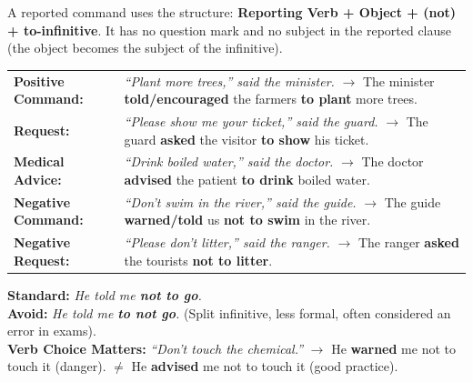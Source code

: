 \documentclass[11pt]{article}
\newcommand{\cle}[1]{{\popxbold\color{popdark}#1}}
\begin{document}
\begin{definition}
A \cle{reported command} uses the structure: \textbf{Reporting Verb + Object + (not) + to-infinitive}. It has no question mark and no subject in the reported clause (the object becomes the subject of the infinitive).
\end{definition}

\begin{exemplebox}
\begin{tabularx}{\linewidth}{@{}lX@{}}
\textbf{Positive Command:} & \emph{``Plant more trees,'' said the minister.} $\to$ The minister \textbf{told/encouraged} the farmers \textbf{to plant} more trees. \\
\textbf{Request:} & \emph{``Please show me your ticket,'' said the guard.} $\to$ The guard \textbf{asked} the visitor \textbf{to show} his ticket. \\
\textbf{Medical Advice:} & \emph{``Drink boiled water,'' said the doctor.} $\to$ The doctor \textbf{advised} the patient \textbf{to drink} boiled water. \\
\textbf{Negative Command:} & \emph{``Don't swim in the river,'' said the guide.} $\to$ The guide \textbf{warned/told} us \textbf{not to swim} in the river. \\
\textbf{Negative Request:} & \emph{``Please don't litter,'' said the ranger.} $\to$ The ranger \textbf{asked} the tourists \textbf{not to litter}.
\end{tabularx}
\end{exemplebox}

\begin{attention}
\textbf{Standard:} \emph{He told me \textbf{not to go}.} \\
\textbf{Avoid:} \emph{He told me \textbf{to not go}.} (Split infinitive, less formal, often considered an error in exams). \\
\textbf{Verb Choice Matters:} \emph{``Don't touch the chemical.''} $\to$ He \textbf{warned} me not to touch it (danger). $\neq$ He \textbf{advised} me not to touch it (good practice).
\end{attention}
\end{document}
